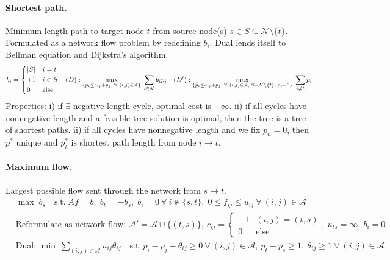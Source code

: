 \documentclass{article}
\begin{document}
\paragraph{Shortest path.} Minimum length path to target node $t$ from source node(s) $s\in S\subseteq \mathcal N\setminus\{t\}$. Formulated as a network flow problem by redefining $b_i$. Dual lends itself to Bellman equation and Dijkstra's algorithm.
\begin{align*}
    b_i = \begin{cases*}
        |S| & $i=t$\\
        +1 & $i\in S$\\
        0 & else
    \end{cases*}
    && (D): \max_{\{p_i \leq c_{ij} + p_j,\;\forall\ (i,j)\in\mathcal A\}}\; \sum_{i\in \mathcal N}b_ip_i
    &&(D'): \max_{\{p_i \leq c_{ij} + p_j,\;\forall\ (i,j)\in\mathcal A,\:S=\mathcal N\setminus\{t\},\; p_t=0\}}\; \sum_{i\neq t}p_i
\end{align*}
Properties: i) if $\exists$ negative length cycle, optimal cost is $-\infty$. ii) if all cycles have nonnegative length and a feasible tree solution is optimal, then the tree is a tree of shortest paths. ii) if all cycles have nonnegative length and we fix $p_n=0$, then $p^*$ unique and $p^*_i$ is shortest path length from node $i\rightarrow t$.

\paragraph{Maximum flow.} Largest possible flow sent through the network from $s\rightarrow t$.
\begin{align*}
    &\max\; b_s \quad \text{s.t.}\; Af = b,\; b_t = -b_s,\; b_i = 0\ \forall\ i\notin\{s,t\},\;
    0\leq f_{ij}\leq u_{ij}\ \forall\ (i,j)\in \mathcal A\\
    &\text{Reformulate as network flow: }
    \mathcal A' = \mathcal A\cup\{(t,s)\},\
    c_{ij} = \begin{cases*}
        -1 & \text{$(i,j)=(t,s)$}\\
        0 & \text{else}
    \end{cases*},\ u_{ts} = \infty,\ b_i = 0\\
    &\text{Dual: }\min\ \sum_{(i,j)\in \mathcal A} u_{ij}\theta_{ij}
    \quad\text{s.t.}\ p_i - p_j + \theta_{ij}\geq0\ \forall\ (i,j)\in\mathcal A,\
    p_t - p_s \geq 1,\ \theta_{ij}\geq 1\ \forall\ (i,j)\in\mathcal A
\end{align*}
\end{document}
